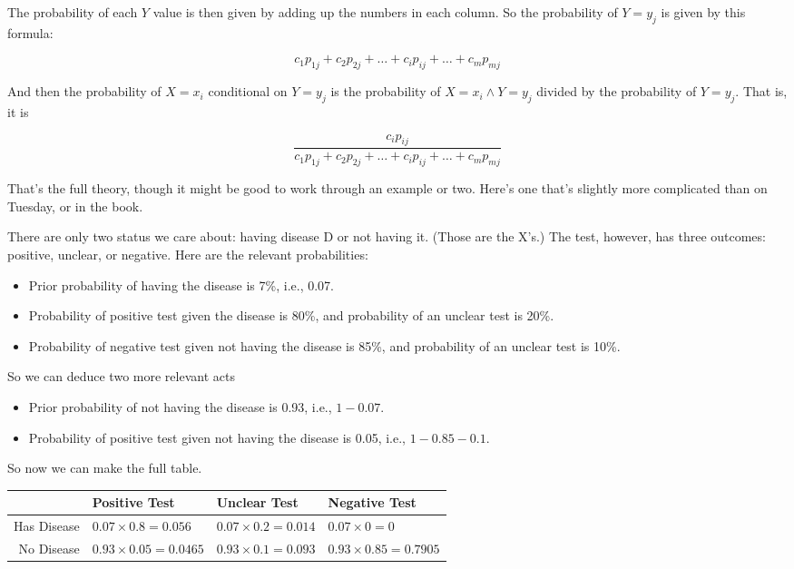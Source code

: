The probability of each $Y$ value is then given by adding up the numbers in each column. So the probability of $Y = y_j$ is given by this formula:

\[
c_1p_{1j} + c_2p_{2j} + \dots + c_ip_{ij} + \dots + c_mp_{mj}
\]

And then the probability of $X = x_i$ conditional on $Y = y_j$ is the probability of $X = x_i \wedge Y = y_j$ divided by the probability of $Y = y_j$. That is, it is

\[
\frac{c_ip_{ij}}{c_1p_{1j} + c_2p_{2j} + \dots + c_ip_{ij} + \dots + c_mp_{mj}}
\]

That's the full theory, though it might be good to work through an example or two. Here's one that's slightly more complicated than on Tuesday, or in the book.

There are only two status we care about: having disease D or not having it. (Those are the X's.) The test, however, has three outcomes: positive, unclear, or negative. Here are the relevant probabilities:

\newpage
\begin{itemize}
\item{} Prior probability of having the disease is 7\%, i.e., 0.07.

\item{} Probability of positive test given the disease is 80\%, and probability of an unclear test is 20\%.

\item{} Probability of negative test given not having the disease is 85\%, and probability of an unclear test is 10\%.

\end{itemize}

So we can deduce two more relevant acts

\begin{itemize}
\item{} Prior probability of not having the disease is 0.93, i.e., $1 - 0.07$.

\item{} Probability of positive test given not having the disease is 0.05, i.e., $1 - 0.85 - 0.1$.

\end{itemize}

So now we can make the full table.

\begin{table}[htbp]
\begin{minipage}{\linewidth}
\setlength{\tymax}{0.5\linewidth}
\centering
\small
\begin{tabulary}{\textwidth}{@{}rlll@{}} \toprule
 & Positive Test & Unclear Test & Negative Test \\
\midrule

 Has Disease & $0.07 \times 0.8 = 0.056$ & $0.07 \times 0.2 = 0.014$ & $0.07 \times 0 = 0$ \\
 No Disease & $0.93 \times 0.05 = 0.0465$ & $0.93 \times 0.1 = 0.093$ & $0.93 \times 0.85 = 0.7905$ \\
\bottomrule

\end{tabulary}
\end{minipage}
\end{table}

